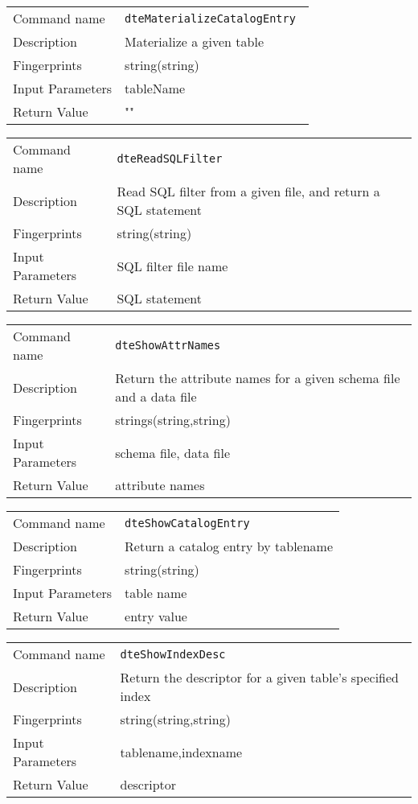 \noindent
\begin{tabular}{l|p{5in}}
\hline
Command name &{\tt dteMaterializeCatalogEntry }\\ 
Description &
Materialize a given table
 	\\
Fingerprints & string(string)\\
Input Parameters&tableName\\
Return Value&""\\
\hline
\end{tabular}
\bigskip

\noindent
\begin{tabular}{l|p{5in}}
\hline
Command name &{\tt dteReadSQLFilter }\\ 
Description &
Read SQL filter from a given file, and return a SQL statement
 	\\
Fingerprints & string(string)\\
Input Parameters& SQL filter file name\\
Return Value&SQL statement\\
\hline
\end{tabular}
\bigskip

\noindent
\begin{tabular}{l|p{5in}}
\hline
Command name &{\tt dteShowAttrNames }\\ 
Description &
Return the attribute names for a given schema file and a data file
 	\\
Fingerprints & strings(string,string)\\
Input Parameters&schema file, data file\\
Return Value&attribute names\\
\hline
\end{tabular}
\bigskip

\noindent
\begin{tabular}{l|p{5in}}
\hline
Command name &{\tt dteShowCatalogEntry }\\ 
Description &
Return a catalog entry by tablename
 	\\
Fingerprints & string(string)\\
Input Parameters&table name\\
Return Value&entry value\\
\hline
\end{tabular}
\bigskip

\noindent
\begin{tabular}{l|p{5in}}
\hline
Command name &{\tt dteShowIndexDesc }\\ 
Description &
Return the descriptor for a given table's specified index
 	\\
Fingerprints & string(string,string)\\
Input Parameters&tablename,indexname\\
Return Value&descriptor\\
\hline
\end{tabular}
\bigskip

